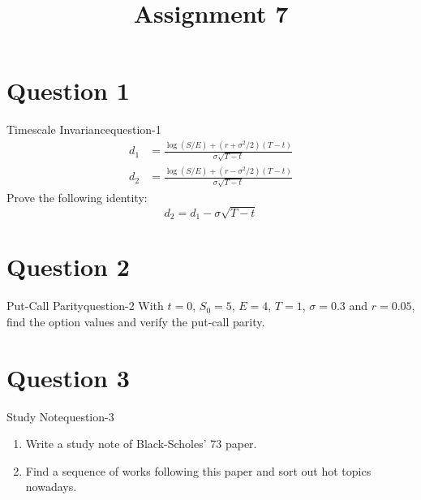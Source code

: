 \title{Assignment 7}


\section{Question 1}
\begin{statebox}{Timescale Invariance}{question-1}
    \begin{align*}
        d_1 &= \frac{\log(S/E)+(r+\sigma^2/2)(T-t)}{\sigma\sqrt{T-t}} \\
        d_2 &= \frac{\log(S/E)+(r-\sigma^2/2)(T-t)}{\sigma\sqrt{T-t}}
    \end{align*}
    Prove the following identity:
    \[
    	d_2 = d_1 - \sigma\sqrt{T-t}
    \]
\end{statebox}




\section{Question 2}
\begin{statebox}{Put-Call Parity}{question-2}
    With $t=0$, $S_0=5$, $E=4$, $T=1$, $\sigma=0.3$ and $r=0.05$, find the option values and verify the put-call parity.
\end{statebox}




\section{Question 3}
\begin{statebox}{Study Note}{question-3}
    \begin{enumerate}
    	\item Write a study note of Black-Scholes' 73 paper.
    	\item Find a sequence of works following this paper and sort out hot topics nowadays.
    \end{enumerate}
\end{statebox}

